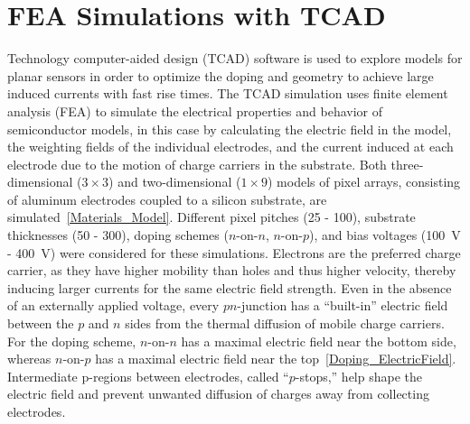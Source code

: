 \section{FEA Simulations with TCAD}
Technology computer-aided design (TCAD) software is used to explore models for planar sensors in order to optimize the doping and geometry to achieve large induced currents with fast rise times.
The TCAD simulation uses finite element analysis (FEA) to simulate the electrical properties and behavior of semiconductor models, in this case by calculating the electric field in the model, the weighting fields of the individual electrodes, and the current induced at each electrode due to the motion of charge carriers in the substrate.
Both three-dimensional ($3 \times 3$) and two-dimensional ($1 \times 9$) models of pixel arrays, consisting of aluminum electrodes coupled to a silicon substrate, are simulated~\ref{Materials_Model}.
Different pixel pitches (\SI{25}{\micron} - \SI{100}{\micron}), substrate thicknesses (\SI{50}{\micron} - \SI{300}{\micron}), doping schemes ($n$-on-$n$, $n$-on-$p$), and bias voltages (\SI{100}{\V} - \SI{400}{\V}) were considered for these simulations.
Electrons are the preferred charge carrier, as they have higher mobility than holes and thus higher velocity, thereby inducing larger currents for the same electric field strength.
Even in the absence of an externally applied voltage, every $pn$-junction has a ``built-in'' electric field between the $p$ and $n$ sides from the thermal diffusion of mobile charge carriers.
For the doping scheme, $n$-on-$n$ has a maximal electric field near the bottom side, whereas $n$-on-$p$ has a maximal electric field near the top~\ref{Doping_ElectricField}.
Intermediate p-regions between electrodes, called ``$p$-stops,'' help shape the electric field and prevent unwanted diffusion of charges away from collecting electrodes.
